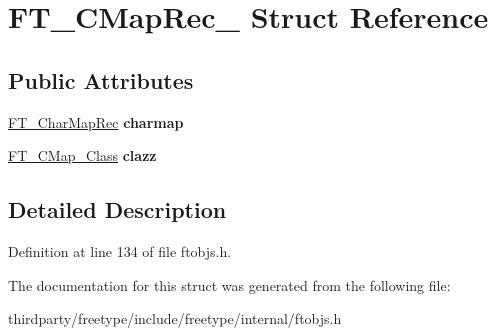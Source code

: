 \hypertarget{struct_f_t___c_map_rec__}{}\section{F\+T\+\_\+\+C\+Map\+Rec\+\_\+ Struct Reference}
\label{struct_f_t___c_map_rec__}
\subsection*{Public Attributes}
\begin{DoxyCompactItemize}
\item 
\mbox{\label{struct_f_t___c_map_rec___a39fa6de9995d4ae4496b93e2b874b34e}} 
\hyperlink{struct_f_t___char_map_rec__}{F\+T\+\_\+\+Char\+Map\+Rec} {\bfseries charmap}
\item 
\mbox{\label{struct_f_t___c_map_rec___aa85db42650df0edb38f8af5887c0ac6a}} 
\hyperlink{struct_f_t___c_map___class_rec__}{F\+T\+\_\+\+C\+Map\+\_\+\+Class} {\bfseries clazz}
\end{DoxyCompactItemize}


\subsection{Detailed Description}


Definition at line 134 of file ftobjs.\+h.



The documentation for this struct was generated from the following file\+:\begin{DoxyCompactItemize}
\item 
thirdparty/freetype/include/freetype/internal/ftobjs.\+h\end{DoxyCompactItemize}
